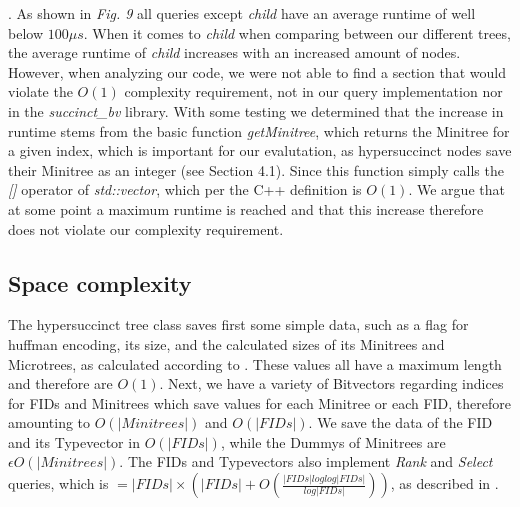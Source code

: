 \documentclass{article}
\begin{document}
\cite{farzanMunro}. As shown in \textit{Fig. 9} all queries except \textit{child} have an average runtime of well below $100 \mu s$. When it comes to \textit{child} when comparing between our different trees, the average runtime of \textit{child} increases with an increased amount of nodes. However, when analyzing our code, we were not able to find a section that would violate the $O(1)$ complexity requirement, not in our query implementation nor in the \textit{succinct\_bv} library. With some testing we determined that the increase in runtime stems from the basic function \textit{getMinitree}, which returns the Minitree for a given index, which is important for our evalutation, as hypersuccinct nodes save their Minitree as an integer (see Section 4.1).
Since this function simply calls the \textit{[]} operator of \textit{std::vector}, which per the C++ definition is $O(1)$. We argue that at some point a maximum runtime is reached and that this increase therefore does not violate our complexity requirement.

\subsection{Space complexity}
The hypersuccinct tree class saves first some simple data, such as a flag for huffman encoding, its size, and the calculated sizes of its Minitrees and Microtrees, as calculated according to \cite{farzanMunro}. These values all have a maximum length and therefore are $O(1)$. Next, we have a variety of Bitvectors regarding indices for FIDs and Minitrees which save values for each Minitree or each FID, therefore amounting to $O(|Minitrees|)$ and $O(|FIDs|)$. We save the data of the FID and its Typevector in $O(|FIDs|)$, while the Dummys of Minitrees are $\epsilon O(|Minitrees|)$. The FIDs and Typevectors also implement \textit{Rank} and \textit{Select} queries, which is $= |FIDs| \times (|FIDs| + O(\frac{|FIDs| log log |FIDs|}{log |FIDs|}))$, as described in \cite{succinctBV}.
\end{document}
